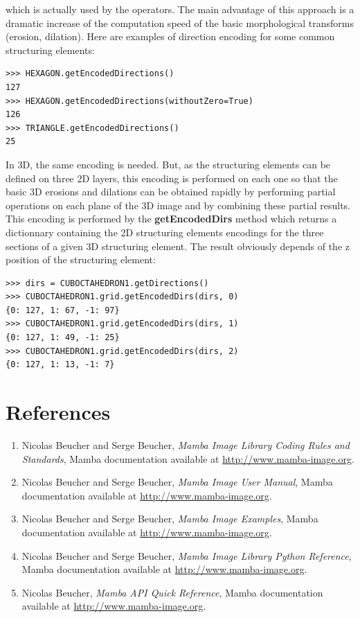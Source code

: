 \documentclass[a4paper,10pt,oneside]{article}
\begin{document}
which is actually used by the operators. The main advantage of this approach is a dramatic increase of the computation speed of the basic
morphological transforms (erosion, dilation). Here are examples of direction encoding for some common structuring elements:

\lstset{language=Python}
\begin{lstlisting}
>>> HEXAGON.getEncodedDirections()
127
>>> HEXAGON.getEncodedDirections(withoutZero=True)
126
>>> TRIANGLE.getEncodedDirections()
25
\end{lstlisting}

In 3D, the same encoding is needed. But, as the structuring elements can be defined on three 2D layers, this encoding is performed on each
one so that the basic 3D erosions and dilations can be obtained rapidly by performing partial operations on each plane of the 3D image and by
combining these partial results. This encoding is performed by the \textbf{getEncodedDirs} method which returns a dictionnary containing the 2D
structuring elements encodings for the three sections of a given 3D structuring element. The result obviously depends of the z position of the
structuring element:

\lstset{language=Python}
\begin{lstlisting}
>>> dirs = CUBOCTAHEDRON1.getDirections()
>>> CUBOCTAHEDRON1.grid.getEncodedDirs(dirs, 0)
{0: 127, 1: 67, -1: 97}
>>> CUBOCTAHEDRON1.grid.getEncodedDirs(dirs, 1)
{0: 127, 1: 49, -1: 25}
>>> CUBOCTAHEDRON1.grid.getEncodedDirs(dirs, 2)
{0: 127, 1: 13, -1: 7}
\end{lstlisting}

\section{References}
\begin{enumerate}
\setcounter{enumi}{0}
\item \label{art:MILCRSman} Nicolas Beucher and Serge Beucher,
\emph{Mamba Image Library Coding Rules and Standards},
Mamba documentation available at \url{http://www.mamba-image.org}.
\item \label{art:MIUman} Nicolas Beucher and Serge Beucher,
\emph{Mamba Image User Manual},
Mamba documentation available at \url{http://www.mamba-image.org}.
\item \label{art:MIEman} Nicolas Beucher and Serge Beucher,
\emph{Mamba Image Examples},
Mamba documentation available at \url{http://www.mamba-image.org}.
\item \label{art:MILPRman} Nicolas Beucher and Serge Beucher,
\emph{Mamba Image Library Python Reference},
Mamba documentation available at \url{http://www.mamba-image.org}.
\item \label{art:MQRman} Nicolas Beucher,
\emph{Mamba API Quick Reference},
Mamba documentation available at \url{http://www.mamba-image.org}.
\end{enumerate}
\end{document}
